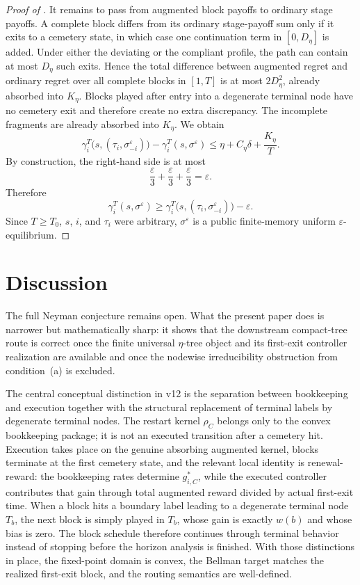 \documentclass[12pt]{article}
\theoremstyle{definition}
\newcommand{\eps}{\varepsilon}
\newcommand{\1}{\mathbf{1}}
\begin{document}
\begin{proof}[Proof of ]
It remains to pass from augmented block payoffs to ordinary stage payoffs. A
complete block differs from its ordinary stage-payoff sum only if it exits to a
cemetery state, in which case one continuation term in $[0,D_\eta]$ is added.
Under either the deviating or the compliant profile, the path can contain at
most $D_\eta$ such exits. Hence the total difference between augmented regret
and ordinary regret over all complete blocks in $[1,T]$ is at most
$2D_\eta^2$, already absorbed into $K_\eta$. Blocks played after entry into a
degenerate terminal node have no cemetery exit and therefore create no extra
discrepancy. The incomplete fragments are already absorbed into $K_\eta$. We obtain
\[
\gamma_i^T\bigl(s,(\tau_i,\sigma^\eps_{-i})\bigr)
-
\gamma_i^T(s,\sigma^\eps)
\le
\eta + C_\eta\delta + \frac{K_\eta}{T}.
\]
By construction, the right-hand side is at most
\[
\frac{\eps}{3}+\frac{\eps}{3}+\frac{\eps}{3}=\eps.
\]
Therefore
\[
\gamma_i^T(s,\sigma^\eps)
\ge
\gamma_i^T\bigl(s,(\tau_i,\sigma^\eps_{-i})\bigr)-\eps.
\]
Since $T\ge T_0$, $s$, $i$, and $\tau_i$ were arbitrary, $\sigma^\eps$ is a
public finite-memory uniform $\eps$-equilibrium.
\end{proof}


\section{Discussion}

The full Neyman conjecture remains open. What the present paper does is narrower
but mathematically sharp: it shows that the downstream compact-tree route is
correct once the finite universal $\eta$-tree object and its first-exit controller
realization are available and once the nodewise irreducibility obstruction from
condition~\textnormal{(a)} is excluded.

The central conceptual distinction in v12 is the separation between
bookkeeping and execution together with the structural replacement of terminal
labels by degenerate terminal nodes. The restart kernel $\rho_C$ belongs only to
the convex bookkeeping package; it is not an executed transition after a
cemetery hit. Execution takes place on the genuine absorbing augmented kernel,
blocks terminate at the first cemetery state, and the relevant local identity is
renewal-reward: the bookkeeping rates determine $g_{i,C}^*$, while the executed
controller contributes that gain through total augmented reward divided by
actual first-exit time. When a block hits a boundary label leading to a
degenerate terminal node $T_b$, the next block is simply played in $T_b$, whose
gain is exactly $w(b)$ and whose bias is zero. The block schedule therefore
continues through terminal behavior instead of stopping before the horizon
analysis is finished. With those distinctions in place, the fixed-point domain
is convex, the Bellman target matches the realized first-exit block, and the
routing semantics are well-defined.
\end{document}
